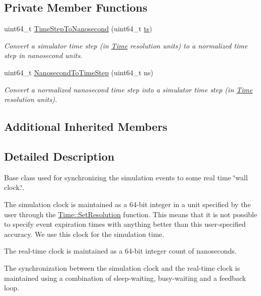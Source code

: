 \subsection*{Private Member Functions}
\begin{DoxyCompactItemize}
\item 
uint64\+\_\+t \hyperlink{classns3_1_1Synchronizer_a6450d12c1de452d0d7cab179e50e6ea5}{Time\+Step\+To\+Nanosecond} (uint64\+\_\+t \hyperlink{mmwave_2model_2fading-traces_2fading__trace__generator_8m_ada841f58d7be618bfbc76c87e7d44086}{ts})
\begin{DoxyCompactList}\small\item\em Convert a simulator time step (in \hyperlink{classns3_1_1Time}{Time} resolution units) to a normalized time step in nanosecond units. \end{DoxyCompactList}\item 
uint64\+\_\+t \hyperlink{classns3_1_1Synchronizer_a840950d82ffdeb0f42ad085ee9268e2b}{Nanosecond\+To\+Time\+Step} (uint64\+\_\+t ns)
\begin{DoxyCompactList}\small\item\em Convert a normalized nanosecond time step into a simulator time step (in \hyperlink{classns3_1_1Time}{Time} resolution units). \end{DoxyCompactList}\end{DoxyCompactItemize}
\subsection*{Additional Inherited Members}


\subsection{Detailed Description}
Base class used for synchronizing the simulation events to some real time \char`\"{}wall clock.\char`\"{}. 

The simulation clock is maintained as a 64-\/bit integer in a unit specified by the user through the \hyperlink{classns3_1_1Time_ac89165ba7715b66017a49c718f4aef09}{Time\+::\+Set\+Resolution} function. This means that it is not possible to specify event expiration times with anything better than this user-\/specified accuracy. We use this clock for the simulation time.

The real-\/time clock is maintained as a 64-\/bit integer count of nanoseconds.

The synchronization between the simulation clock and the real-\/time clock is maintained using a combination of sleep-\/waiting, busy-\/waiting and a feedback loop. 

